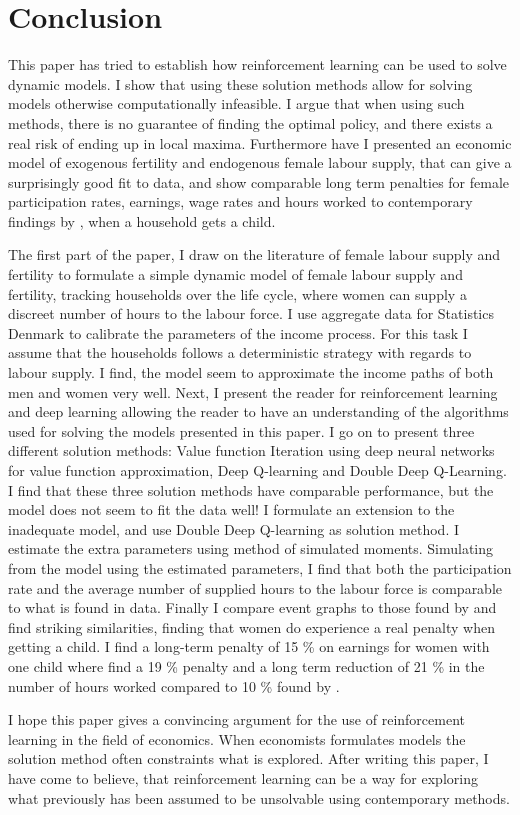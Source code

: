 \section{Conclusion}

This paper has tried to establish how reinforcement learning can be used to solve dynamic models. I show that using these solution methods allow for solving models otherwise computationally infeasible. I argue that when using such methods, there is no guarantee of finding the optimal policy, and there exists a real risk of ending up in local maxima. Furthermore have I presented an economic model of exogenous fertility and endogenous female labour supply, that can give a surprisingly good fit to data, and show comparable long term penalties for female participation rates, earnings, wage rates and hours worked to contemporary findings by \textcite{kleven_children_2019}, when a household gets a child. 

The first part of the paper, I draw on the literature of female labour supply and fertility to formulate a simple dynamic model of female labour supply and fertility, tracking households over the life cycle, where women can supply a discreet number of hours to the labour force. I use aggregate data for Statistics Denmark to calibrate the parameters of the income process. For this task I assume that the households follows a deterministic strategy with regards to labour supply. I find, the model seem to approximate the income paths of both men and women very well. Next, I present the reader for reinforcement learning and deep learning allowing the reader to have an understanding of the algorithms used for solving the models presented in this paper.  I go on to present three different solution methods: Value function Iteration using deep neural networks for value function approximation, Deep Q-learning and Double Deep Q-Learning. I find that these three solution methods have comparable performance, but the model does not seem to fit the data well! I formulate an extension to the inadequate model, and use Double Deep Q-learning as solution method. I estimate the extra parameters using method of simulated moments. Simulating from the model using the estimated parameters, I find that both the participation rate and the average number of supplied hours to the labour force is comparable to what is found in data. Finally I compare event graphs to those found by \textcite{kleven_children_2019} and find striking similarities, finding that women do experience a real penalty when getting a child. I find a long-term penalty of 15 \% on earnings for women with one child where \textcite{kleven_children_2019} find a 19 \% penalty and a long term reduction of 21 \%  in the number of hours worked compared to 10 \% found by \textcite{kleven_children_2019}.  

I hope this paper gives a convincing argument for the use of reinforcement learning in the field of economics. When economists formulates models the solution method often constraints what is explored. After writing this paper, I have come to believe, that reinforcement learning can be a way for exploring what previously has been assumed to be unsolvable using contemporary methods.